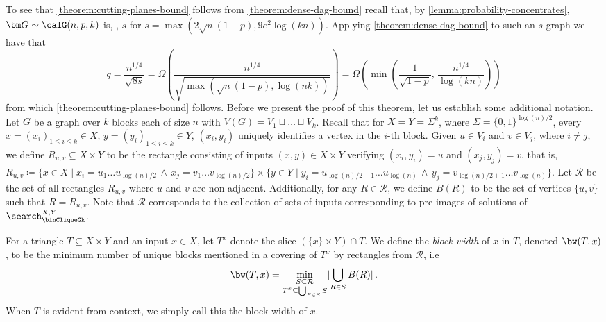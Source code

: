To see that \autoref{theorem:cutting-planes-bound} follows from \autoref{theorem:dense-dag-bound} recall that, by     \autoref{lemma:probability-concentrates}, $\bm G\sim \calG(n,p,k)$ is, \aas, $s$-\ndense for $s=\max(2\sqrt{n}(1-p),9e^2\log(kn))$. Applying \autoref{theorem:dense-dag-bound} to such an $s$-\ndense graph we have that 
\begin{equation*}
    q = \frac{n^{1/4}}{\sqrt{8s}} = \Omega\left(\frac{n^{1/4}}{\sqrt{\max(\sqrt{n}(1-p),\log(nk))}}\right) = \Omega\left({\min\left(
    \frac{1}{\sqrt{1-p}},
    \,
    \frac{n^{1/4}}{\log(kn)}\right)}\right)
\end{equation*}
from which \autoref{theorem:cutting-planes-bound} follows.
Before we present the proof of this theorem, let us establish some additional notation.
Let $G$ be a graph over $k$ blocks each of size $n$ with $V(G)=V_1 \sqcup \dots \sqcup V_k$. Recall that for $X = Y =\Sigma^k$, where $\Sigma=\{0,1\}^{ \log(n)/2}$, every $x = (x_i)_{1\leq i\leq k}\in X$, $y = (y_i)_{1\leq i\leq k}\in Y$,  $(x_i,y_i)$ uniquely identifies a vertex in the $i$-th block. 
Given $u\in V_i$ and $v \in V_j$, where $i\neq j$, we define $R_{u,v} \subseteq X\times Y$ to be the rectangle 
consisting of inputs $(x,y) \in X\times Y$ verifying $ (x_i,y_i)=u$ and $(x_j,y_j)=v$, that is,
$R_{u,v} \coloneqq \{x \in X \mid x_i = u_1\ldots u_{\log(n)/2}\,\land \, x_j = v_1\ldots v_{\log(n)/2} \} \times  \{y \in Y \mid y_i = u_{\log(n)/2+1}\ldots u_{\log(n)}\, \land \, y_j = v_{\log(n)/2+1}\ldots v_{\log(n)} \}$.
Let $\mathcal{R}$ be the set of all rectangles $R_{u,v}$ where $u$ and $v$ are non-adjacent. Additionally, for any $R \in \mathcal{R}$, we define $B(R)$ to be the set of vertices $\{u,v\}$ such that $R = R_{u,v}$. Note that $\mathcal{R}$ corresponds to the collection of sets of inputs corresponding to pre-images of solutions of $\search_{\binCliqueGk}^{X,Y}$.

For a triangle $T \subseteq X\times Y$ and an input $x \in X$, let $T^x$ denote the slice $(\{x\}\times Y)\cap T$. We define the \emph{block width} \cite{Sokolov24RandomCNFs, BeameW2025multiparty} of $x$ in $T$, denoted $\bw(T,x)$, to be the minimum number of unique blocks mentioned in a covering of $T^x$ by rectangles from $\mathcal{R}$, i.e 
\begin{equation*}
\bw(T,x) = \min_{\substack{S \subseteq \mathcal{R}\\T^x \subseteq \bigcup_{R \in S}S}}\lvert\bigcup_{R \in S} B(R) \rvert \,. 
\end{equation*}
When $T$ is evident from context, we simply call this the block width of $x$. 

